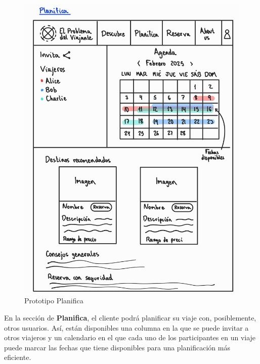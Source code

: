 \documentclass[11pt, a4paper]{book}
\begin{document}
	\newpage 
	
	\begin{figure} [H]
		\centering
		\includegraphics[width=\textwidth]{3-planifica.jpg}
		\caption{Prototipo Planifica}
	\end{figure} 

	En la sección de \textbf{Planifica}, el cliente podrá planificar su viaje con, posiblemente, otros usuarios. Así, están disponibles una columna en la que se puede invitar a otros viajeros y un calendario en el que cada uno de los participantes en un viaje puede marcar las fechas que tiene disponibles para una planificación más eficiente.

	\newpage
	
\end{document}
